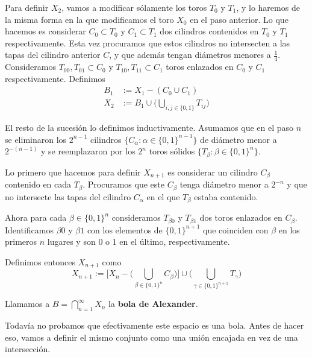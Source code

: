 Para definir $X_2$, vamos a modificar sólamente los toros $T_0$ y $T_1$, y lo haremos de la misma forma en la que modificamos el toro $X_0$ en el paso anterior. Lo que hacemos es considerar $C_0\subset T_0$ y $C_1\subset T_1$ dos cilindros contenidos en $T_0$ y $T_1$ respectivamente. Esta vez procuramos que estos cilindros no intersecten a las tapas del cilindro anterior $C$, y que además tengan diámetros menores a $\frac{1}{4}$. Consideramos $T_{00}, T_{01}\subset C_0$ y $T_{10}, T_{11}\subset C_1$ toros enlazados en $C_0$ y $C_1$ respectivamente. Definimos \begin{align*} B_1&:= X_1-(C_0\cup C_1)\\
    X_2&:=B_1\cup\bigg(\bigcup\limits_{i,j\in\{0,1\}} T_{ij}\bigg)\end{align*}

El resto de la sucesión lo definimos inductivamente. Asumamos que en el paso $n$ se eliminaron los $2^{n-1}$ cilindros $\{C_\alpha : \alpha\in \{0,1\}^{n-1}\}$ de diámetro menor a $2^{-(n-1)}$ y se reemplazaron por los $2^n$ toros sólidos $\{T_\beta : \beta\in \{0,1\}^{n}\}$. 

Lo primero que hacemos para definir $X_{n+1}$ es considerar un cilindro $C_\beta$ contenido en cada $T_\beta$. Procuramos que este $C_\beta$ tenga diámetro menor a $2^{-n}$ y que no intersecte las tapas del cilindro $C_\alpha$ en el que $T_\beta$ estaba contenido.

Ahora para cada $\beta\in\{0,1\}^n$ consideramos $T_{\beta 0}$ y $T_{\beta 1}$ dos toros enlazados en $C_\beta$. Identificamos $\beta 0$ y $\beta 1$ con los elementos de $\{0,1\}^{n+1}$ que coinciden con $\beta$ en los primeros $n$ lugares y son $0$ o $1$ en el último, respectivamente.

Definimos entonces $X_{n+1}$ como $$X_{n+1}:=\bigg[X_n-\bigg(\bigcup\limits_{\beta\in\{0,1\}^n} C_\beta \bigg)\bigg]\cup\bigg( \bigcup\limits_{\gamma\in\{0,1\}^{n+1}}T_\gamma\bigg)$$

Llamamos a $B=\bigcap\limits_{n=1}^\infty X_n$ la \textbf{bola de Alexander}.


Todavía no probamos que efectivamente este espacio es una bola. Antes de hacer eso, vamos a definir el mismo conjunto como una unión encajada en vez de una intersección.

